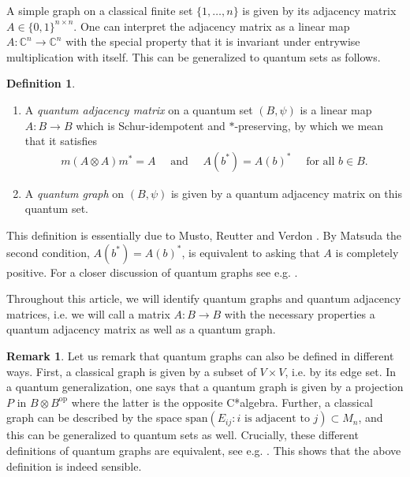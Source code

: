 \documentclass{amsart}
\newcommand{\C}{\mathbb{C}}
\theoremstyle{definition}
\newtheorem{remark}[thm]{Remark}
\newtheorem{definition}[thm]{Definition}
\theoremstyle{definition}
\begin{document}
A simple graph on a classical finite set $\{1, \dots, n\}$ is given by its adjacency matrix $A \in \{0,1\}^{n \times n}$. One can interpret the adjacency matrix as a linear map $A: \C^n \to \C^n$ with the special property that it is invariant under entrywise multiplication with itself. This can be generalized to quantum sets as follows.

\begin{definition}
    \begin{enumerate}
        \item A \emph{quantum adjacency matrix} on a quantum set $(B, \psi)$ is a linear map $A: B \to B$ which is Schur-idempotent and $\ast$-preserving, by which we mean that it satisfies
        \begin{align*}
            m(A \otimes A)m^\ast = A 
            \quad \text{ and } \quad
            A(b^\ast) = A(b)^\ast \quad \text{ for all } b \in B.
        \end{align*}

        \item A \emph{quantum graph} on $(B, \psi)$ is given by a quantum adjacency matrix on this quantum set. 
    \end{enumerate}
\end{definition}

This definition is essentially due to Musto, Reutter and Verdon \cite{musto_compositional_2018}. By Matsuda \cite{matsuda_classification_2022} the second condition, $A(b^\ast) = A(b)^\ast$, is equivalent to asking that $A$ is completely positive. For a closer discussion of quantum graphs see e.g. \cite{daws_quantum_2024, wasilewski_quantum_2024}.

Throughout this article, we will identify quantum graphs and quantum adjacency matrices, i.e. we will call a matrix $A: B \to B$ with the necessary properties a quantum adjacency matrix as well as a quantum graph.

\begin{remark}
    Let us remark that quantum graphs can also be defined in different ways. First, a classical graph is given by a subset of $V \times V$, i.e. by its edge set. In a quantum generalization, one says that a quantum graph is given by a projection $P$ in $B \otimes B^{\mathrm{op}}$ where the latter is the opposite C*algebra. Further, a classical graph can be described by the space $\mathrm{span}(E_{ij} : i \text{ is adjacent to } j) \subset M_n$, and this can be generalized to quantum sets as well. Crucially, these different definitions of quantum graphs are equivalent, see e.g. \cite{musto_compositional_2018, daws_quantum_2024,wasilewski_quantum_2024}. This shows that the above definition is indeed sensible.
\end{remark}
\end{document}
